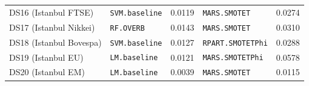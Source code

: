 \begin{table}[t]
{{\begin{tabular}{lllll}
DS16 (Istanbul FTSE) & \texttt{SVM.baseline} & 0.0119 & \texttt{MARS.SMOTET} & 0.0274 \\
DS17 (Istanbul Nikkei) & \texttt{RF.OVERB} & 0.0143 & \texttt{MARS.SMOTET} & 0.0310 \\
DS18 (Istanbul Bovespa) & \texttt{SVM.baseline} & 0.0127 & \texttt{RPART.SMOTETPhi} & 0.0288 \\
DS19 (Istanbul EU) & \texttt{LM.baseline} & 0.0121 & \texttt{MARS.SMOTETPhi} & 0.0578 \\
DS20 (Istanbul EM) & \texttt{LM.baseline} & 0.0039 & \texttt{MARS.SMOTET} & 0.0115 \\
\bottomrule
\end{tabular}%
}%
}
\end{table}
